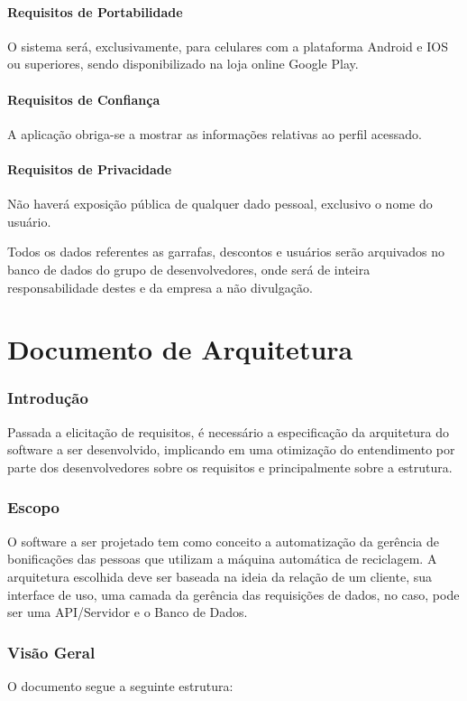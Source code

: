 \begin{apendicesenv}
\subsubsection{Requisitos de Portabilidade}
O sistema será, exclusivamente, para celulares com a plataforma Android e IOS ou superiores, sendo disponibilizado na loja online Google Play.

\subsubsection{Requisitos de Confiança}
A aplicação obriga-se a mostrar as informações relativas ao perfil acessado.

\subsubsection{Requisitos de Privacidade}
Não haverá exposição pública de qualquer dado pessoal, exclusivo o nome do usuário.

Todos os dados referentes as garrafas, descontos e usuários serão arquivados no banco de dados do grupo de desenvolvedores, onde será de inteira responsabilidade destes e da empresa a não divulgação.

\chapter{Documento de Arquitetura}
\subsection{Introdução}
Passada a elicitação de requisitos, é necessário a especificação da arquitetura do software a ser desenvolvido, implicando em uma otimização do entendimento por parte dos desenvolvedores sobre os requisitos e principalmente sobre a estrutura.

\subsection{Escopo}
O software a ser projetado tem como conceito a automatização da gerência de bonificações das pessoas que utilizam a máquina automática de reciclagem. A arquitetura escolhida deve ser baseada na ideia da relação de um cliente, sua interface de uso, uma camada da gerência das requisições de dados, no caso, pode ser uma API/Servidor e o Banco de Dados.

\subsection{Visão Geral}
O documento segue a seguinte estrutura:


\end{apendicesenv}
